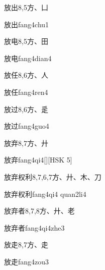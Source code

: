 \begin{entry}{放出}{8,5}{⽅、⼐}
  \begin{phonetics}{放出}{fang4chu1}
  \end{phonetics}
\end{entry}

\begin{entry}{放电}{8,5}{⽅、⽥}
  \begin{phonetics}{放电}{fang4dian4}
  \end{phonetics}
\end{entry}

\begin{entry}{放任}{8,6}{⽅、⼈}
  \begin{phonetics}{放任}{fang4ren4}
  \end{phonetics}
\end{entry}

\begin{entry}{放过}{8,6}{⽅、⾡}
  \begin{phonetics}{放过}{fang4guo4}
  \end{phonetics}
\end{entry}

\begin{entry}{放弃}{8,7}{⽅、⼶}
  \begin{phonetics}{放弃}{fang4qi4}[][HSK 5]
  \end{phonetics}
\end{entry}

\begin{entry}{放弃权利}{8,7,6,7}{⽅、⼶、⽊、⼑}
  \begin{phonetics}{放弃权利}{fang4qi4 quan2li4}
  \end{phonetics}
\end{entry}

\begin{entry}{放弃者}{8,7,8}{⽅、⼶、⽼}
  \begin{phonetics}{放弃者}{fang4qi4zhe3}
  \end{phonetics}
\end{entry}

\begin{entry}{放走}{8,7}{⽅、⾛}
  \begin{phonetics}{放走}{fang4zou3}
  \end{phonetics}
\end{entry}

